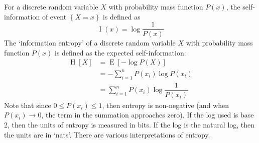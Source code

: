 \documentclass[11pt]{report} %
\begin{document}
For a discrete random variable $X$ with probability mass function $P\left(x\right)$, the self-information of event $\left\{X = x\right\}$ is defined as
\begin{equation}
\operatorname{I}\left(x\right) = \log\dfrac{1}{P\left(x\right)}
\end{equation}
The `information entropy' of a discrete random variable $X$ with probability mass function $P\left(x\right)$ is defined as the expected self-information:
\begin{align}
\operatorname{H}\left[X\right] &= \operatorname{E}\left[-\log P\left(X\right)\right] \\
&= -\sum_{i = 1}^{n}P\left(x_{i}\right)\log P\left(x_{i}\right) \\
&= \sum_{i = 1}^{n}P\left(x_{i}\right)\log \dfrac{1}{P\left(x_{i}\right)}
\end{align}
Note that since $0 \leq P\left(x_{i}\right) \leq 1$, then entropy is non-negative (and when $P\left(x_{i}\right) \rightarrow 0$, the term in the summation approaches zero). If the log used is base 2, then the units of entropy is measured in bits. If the log is the natural log, then the units are in `nats'. There are various interpretations of entropy.
\end{document}
